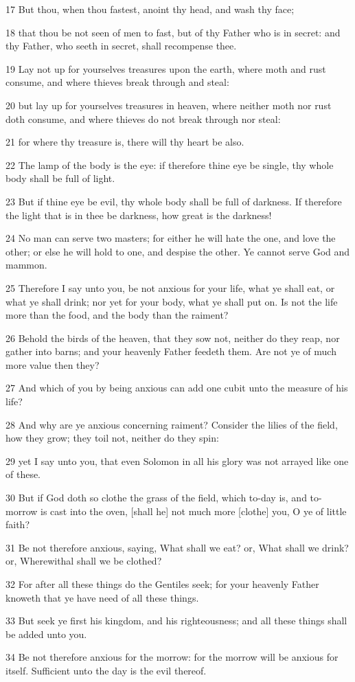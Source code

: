 \par 17 But thou, when thou fastest, anoint thy head, and wash thy face;
\par 18 that thou be not seen of men to fast, but of thy Father who is in secret: and thy Father, who seeth in secret, shall recompense thee.
\par 19 Lay not up for yourselves treasures upon the earth, where moth and rust consume, and where thieves break through and steal:
\par 20 but lay up for yourselves treasures in heaven, where neither moth nor rust doth consume, and where thieves do not break through nor steal:
\par 21 for where thy treasure is, there will thy heart be also.
\par 22 The lamp of the body is the eye: if therefore thine eye be single, thy whole body shall be full of light.
\par 23 But if thine eye be evil, thy whole body shall be full of darkness. If therefore the light that is in thee be darkness, how great is the darkness!
\par 24 No man can serve two masters; for either he will hate the one, and love the other; or else he will hold to one, and despise the other. Ye cannot serve God and mammon.
\par 25 Therefore I say unto you, be not anxious for your life, what ye shall eat, or what ye shall drink; nor yet for your body, what ye shall put on. Is not the life more than the food, and the body than the raiment?
\par 26 Behold the birds of the heaven, that they sow not, neither do they reap, nor gather into barns; and your heavenly Father feedeth them. Are not ye of much more value then they?
\par 27 And which of you by being anxious can add one cubit unto the measure of his life?
\par 28 And why are ye anxious concerning raiment? Consider the lilies of the field, how they grow; they toil not, neither do they spin:
\par 29 yet I say unto you, that even Solomon in all his glory was not arrayed like one of these.
\par 30 But if God doth so clothe the grass of the field, which to-day is, and to-morrow is cast into the oven, [shall he] not much more [clothe] you, O ye of little faith?
\par 31 Be not therefore anxious, saying, What shall we eat? or, What shall we drink? or, Wherewithal shall we be clothed?
\par 32 For after all these things do the Gentiles seek; for your heavenly Father knoweth that ye have need of all these things.
\par 33 But seek ye first his kingdom, and his righteousness; and all these things shall be added unto you.
\par 34 Be not therefore anxious for the morrow: for the morrow will be anxious for itself. Sufficient unto the day is the evil thereof.

